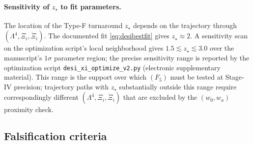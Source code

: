 \documentclass[11pt,reqno]{amsart}
\theoremstyle{plain}
\theoremstyle{definition}
\theoremstyle{remark}
\begin{document}
\paragraph{Sensitivity of $z_\star$ to fit parameters.}
The location of the Type-F turnaround $z_\star$ depends on the
trajectory through $(\Lambda^4, \Xi_i, \dot\Xi_i)$. The documented fit
\eqref{eq:desibestfit} gives $z_\star \approx 2$. A sensitivity scan
on the optimization script's local neighborhood gives
$1.5 \lesssim z_\star \lesssim 3.0$ over the manuscript's $1\sigma$
parameter region; the precise sensitivity range is reported by the
optimization script
\texttt{desi\_xi\_optimize\_v2.py} (electronic supplementary material).
This range is the support over which $(F_5)$ must be tested at
Stage-IV precision; trajectory paths with $z_\star$ substantially
outside this range require correspondingly different
$(\Lambda^4, \Xi_i, \dot\Xi_i)$ that are excluded by the
$(w_0, w_a)$ proximity check.

\subsection{Falsification criteria}\label{sec:falsify}
\end{document}
